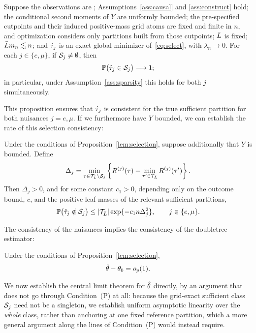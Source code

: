 \documentclass[12pt]{article}
\begin{document}
\begin{proposition}
\label{lem:selection}
Suppose the observations are \iid; Assumptions~\ref{ass:causal} and
\ref{ass:construct} hold; the conditional second moments of $Y$ are uniformly
bounded; the pre-specified cutpoints and their induced positive-mass grid
atoms are fixed and finite in $n$, and optimization considers only partitions
built from those cutpoints; $\bar{L}$ is fixed;
$\bar{L} m_n\lesssim n$; and $\hat{\tau}_j$ is an exact global minimizer
of~\eqref{eq:select}, with $\lambda_n\to0$. For each $j\in\{e,\mu\}$, if
$\mathcal{S}_j\ne\emptyset$, then
\[
  \mathbb{P}\bigl(\hat{\tau}_j\in\mathcal{S}_j\bigr)\longrightarrow1 ;
\]
in particular, under Assumption~\ref{ass:sparsity} this holds for both $j$
simultaneously.
\end{proposition}

This proposition ensures that $\hat{\tau}_j$ is consistent for the true sufficient partition for both nuisances $j = e, \mu$. If we furthermore have $Y$ bounded, we can establish the rate of this selection consistency:

\begin{proposition}
\label{prop:selection-rate}
Under the conditions of Proposition~\ref{lem:selection}, suppose additionally
that $Y$ is bounded. Define
\[
  \Delta_j
  =
  \min_{\tau\in\mathcal{T}_{\bar{L}}\setminus\mathcal{S}_j}
  \left\{
    R^{(j)}(\tau)
    -
    \min_{\tau'\in\mathcal{T}_{\bar{L}}}R^{(j)}(\tau')
  \right\}.
\]
Then $\Delta_j>0$, and for some constant $c_1>0$, depending only on the
outcome bound, $c$, and the positive leaf masses of the relevant sufficient
partitions,
\[
  \mathbb{P}\bigl(\hat{\tau}_j\notin\mathcal{S}_j\bigr)
  \le
  \left|\mathcal{T}_{\bar{L}}\right|\exp\{-c_1n\Delta_j^2\},
  \qquad j\in\{e,\mu\}.
\]
\end{proposition}

The consistency of the nuisances implies the consistency of the doubletree estimator:

\begin{corollary}[Consistency]
\label{cor:consistency}
Under the conditions of Proposition~\ref{lem:selection},
\[
  \hat{\theta}-\theta_0=o_p(1).
\]
\end{corollary}

We now establish the central limit theorem for $\hat{\theta}$ directly, by an
argument that does not go through Condition~(P) at all: because the
grid-exact sufficient class $\mathcal{S}_j$ need not be a singleton, we establish
uniform asymptotic linearity over the \emph{whole} class, rather than
anchoring at one fixed reference partition, which a more general argument
along the lines of Condition~(P) would instead require.
\end{document}
